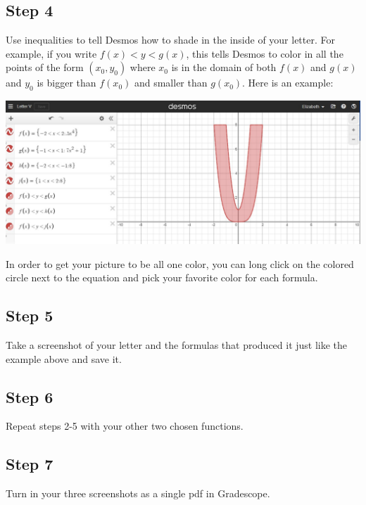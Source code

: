 \documentclass{ximera}
\begin{document}
\subsection{Step 4}  Use inequalities to tell Desmos how to shade in the inside of your letter.  For example, if you write $f(x)<y<g(x)$, this tells Desmos to color in all the points of the form $(x_0,y_0)$ where $x_0$ is in the domain of both $f(x)$ and $g(x)$ and $y_0$ is bigger than $f(x_0)$ and smaller than $g(x_0)$.  Here is an example:

\begin{center}  
\end{center} 

\begin{image}
\includegraphics[width=\textwidth]{LetterVExample.jpg}
\end{image}

In order to get your picture to be all one color, you can long click on the colored circle next to the equation and pick your favorite color for each formula.

\subsection{Step 5}  Take a screenshot of your letter and the formulas that produced it just like the example above and save it.

\subsection{Step 6}  Repeat steps 2-5 with your other two chosen functions.

\subsection{Step 7}  Turn in your three screenshots as a single pdf in Gradescope.
 
\end{document}
